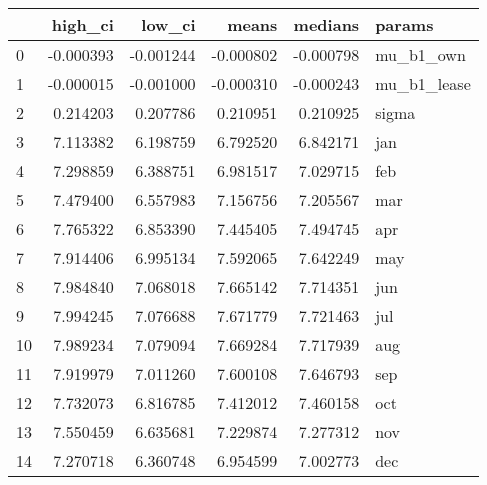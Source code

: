 \begin{tabular}{lrrrrl}
\toprule
{} &   high\_ci &    low\_ci &     means &   medians &       params \\
\midrule
0  & -0.000393 & -0.001244 & -0.000802 & -0.000798 &    mu\_b1\_own \\
1  & -0.000015 & -0.001000 & -0.000310 & -0.000243 &  mu\_b1\_lease \\
2  &  0.214203 &  0.207786 &  0.210951 &  0.210925 &        sigma \\
3  &  7.113382 &  6.198759 &  6.792520 &  6.842171 &          jan \\
4  &  7.298859 &  6.388751 &  6.981517 &  7.029715 &          feb \\
5  &  7.479400 &  6.557983 &  7.156756 &  7.205567 &          mar \\
6  &  7.765322 &  6.853390 &  7.445405 &  7.494745 &          apr \\
7  &  7.914406 &  6.995134 &  7.592065 &  7.642249 &          may \\
8  &  7.984840 &  7.068018 &  7.665142 &  7.714351 &          jun \\
9  &  7.994245 &  7.076688 &  7.671779 &  7.721463 &          jul \\
10 &  7.989234 &  7.079094 &  7.669284 &  7.717939 &          aug \\
11 &  7.919979 &  7.011260 &  7.600108 &  7.646793 &          sep \\
12 &  7.732073 &  6.816785 &  7.412012 &  7.460158 &          oct \\
13 &  7.550459 &  6.635681 &  7.229874 &  7.277312 &          nov \\
14 &  7.270718 &  6.360748 &  6.954599 &  7.002773 &          dec \\
\bottomrule
\end{tabular}
